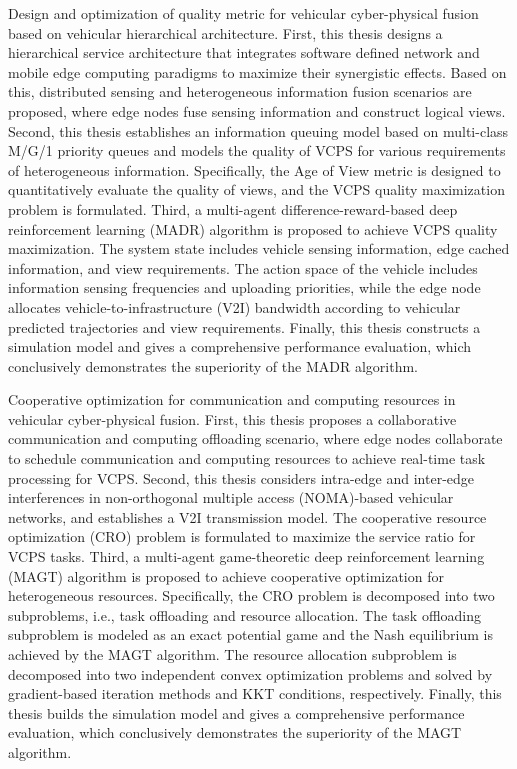 \begin{eabstract}
 Design and optimization of quality metric for vehicular cyber-physical fusion based on vehicular hierarchical architecture. First, this thesis designs a hierarchical service architecture that integrates software defined network and mobile edge computing paradigms to maximize their synergistic effects. Based on this, distributed sensing and heterogeneous information fusion scenarios are proposed, where edge nodes fuse sensing information and construct logical views. Second, this thesis establishes an information queuing model based on multi-class M/G/1 priority queues and models the quality of VCPS for various requirements of heterogeneous information. Specifically, the Age of View metric is designed to quantitatively evaluate the quality of views, and the VCPS quality maximization problem is formulated. Third, a multi-agent difference-reward-based deep reinforcement learning (MADR) algorithm is proposed to achieve VCPS quality maximization. The system state includes vehicle sensing information, edge cached information, and view requirements. The action space of the vehicle includes information sensing frequencies and uploading priorities, while the edge node allocates vehicle-to-infrastructure (V2I) bandwidth according to vehicular predicted trajectories and view requirements. Finally, this thesis constructs a simulation model and gives a comprehensive performance evaluation, which conclusively demonstrates the superiority of the MADR algorithm.

 Cooperative optimization for communication and computing resources in vehicular cyber-physical fusion. First, this thesis proposes a collaborative communication and computing offloading scenario, where edge nodes collaborate to schedule communication and computing resources to achieve real-time task processing for VCPS. Second, this thesis considers intra-edge and inter-edge interferences in non-orthogonal multiple access (NOMA)-based vehicular networks, and establishes a V2I transmission model. The cooperative resource optimization (CRO) problem is formulated to maximize the service ratio for VCPS tasks. Third, a multi-agent game-theoretic deep reinforcement learning (MAGT) algorithm is proposed to achieve cooperative optimization for heterogeneous resources. Specifically, the CRO problem is decomposed into two subproblems, i.e., task offloading and resource allocation. The task offloading subproblem is modeled as an exact potential game and the Nash equilibrium is achieved by the MAGT algorithm. The resource allocation subproblem is decomposed into two independent convex optimization problems and solved by gradient-based iteration methods and KKT conditions, respectively. Finally, this thesis builds the simulation model and gives a comprehensive performance evaluation, which conclusively demonstrates the superiority of the MAGT algorithm.


\end{eabstract}
